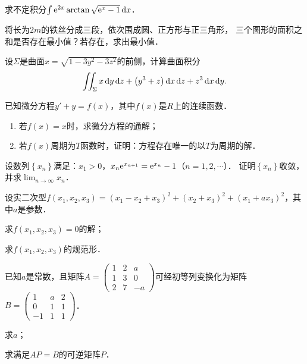 \documentclass[plain,noanswer,medmath]{../../template/jnuexam}
\begin{document}


\begin{problem}[points=10]
求不定积分$\int \mathrm{e}^{2x}\arctan \sqrt{\mathrm{e}^x - 1} \mathop{}\!\mathrm{d} x$．
\end{problem}


\begin{problem}[points=10]
将长为$2m$的铁丝分成三段，依次围成圆、正方形与正三角形，
三个图形的面积之和是否存在最小值？若存在，求出最小值．
\end{problem}


\begin{problem}[points=10]
设$\Sigma$是曲面$x = \sqrt{1 - 3y^2 - 3z^2}$的前侧，计算曲面积分
$$\iint_{\Sigma}x\mathop{}\!\mathrm{d} y\mathop{}\!\mathrm{d} z + \left(y^3 + z \right)\mathop{}\!\mathrm{d} x\mathop{}\!\mathrm{d} z + z^3 \mathop{}\!\mathrm{d} x\mathop{}\!\mathrm{d} y.$$
\end{problem}


\begin{problem}[points=10]
已知微分方程$y' + y = f(x)$，其中$f(x)$是$R$上的连续函数．
\begin{enumerate}
\item 若$f(x) = x$时，求微分方程的通解；
\item 若$f(x)$周期为$T$函数时，证明：方程存在唯一的以$T$为周期的解．
\end{enumerate}
\end{problem}


\begin{problem}[points=10]
设数列$\left\{x_n \right\}$满足：$x_1 > 0$，$x_n \mathrm{e}^{x_{n + 1}} = \mathrm{e}^{x_n} - 1$（$n = 1,2, \cdots$）．
证明$\left\{x_n \right\}$收敛，并求$\lim_{n \to \infty} x_n$．
\end{problem}


\begin{problem}[points=11]
设实二次型$f(x_1,x_2,x_3) = (x_1 - x_2 + x_3)^2 + (x_2 + x_3)^2 + (x_1 + ax_3)^2$，其中$a$是参数．\par
\begin{enumerate*}
\item 求$f(x_1,x_2,x_3) = 0$的解；
\item 求$f(x_1,x_2,x_3)$的规范形．
\end{enumerate*}
\end{problem}


\begin{problem}[points=11]
已知$a$是常数，且矩阵$A = \begin{pmatrix}
  1 & 2 & a \\
  1 & 3 & 0 \\
  2 & 7 & -a
\end{pmatrix}$可经初等列变换化为矩阵$B = \begin{pmatrix}
   1 & a & 2 \\
   0 & 1 & 1 \\
  -1 & 1 & 1
\end{pmatrix}$．\par
\begin{enumerate*}
\item 求$a$；
\item 求满足$AP = B$的可逆矩阵$P$．
\end{enumerate*}
\end{problem}
\end{document}
